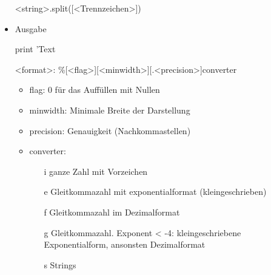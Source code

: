 \documentclass[a4paper,9pt,DIV15,twocolumn]{scrartcl}
\begin{document}
\begin{itemize}
\begin{sagein}
 <string>.split([<Trennzeichen>])
\end{sagein}
\item Ausgabe
\begin{sagein}
  print 'Text %
 \end{sagein}
 <format>:  \%[<flag>][<minwidth>][.<precision>]converter
 \begin{itemize}
\item flag: 0 für das Auffüllen mit Nullen
\item minwidth: Minimale Breite der Darstellung
\item precision: Genauigkeit (Nachkommastellen)
\item converter:
    \begin{itemize}
        \item[i]  ganze Zahl mit Vorzeichen
        \item[e]  Gleitkommazahl mit exponentialformat (kleingeschrieben)
        \item[f]  Gleitkommazahl im Dezimalformat
        \item[g]  Gleitkommazahl. Exponent < -4: kleingeschriebene Exponentialform, ansonsten Dezimalformat
        \item[s]  Strings
    \end{itemize}
 \end{itemize}

\end{itemize}
\end{document}
